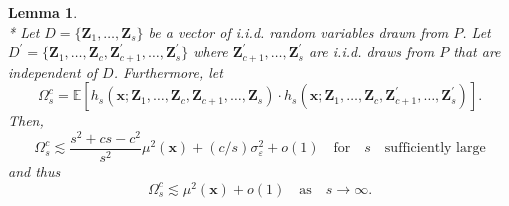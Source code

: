\documentclass[letterpaper,10pt]{article}
\numberwithin{equation}{section}
\numberwithin{thm}{section}
\newtheorem{lem}{Lemma}
\numberwithin{lem}{section}
\numberwithin{cor}{section}
\newcommand{\E}{\mathbb{E}}
\newcommand{\1}{\mathbbm{1}}
\begin{document}
\newpage
\begin{lem}\label{lem:omega_sc}\mbox{}\\*
	Let $D = \{\mathbf{Z}_1, \dotsc, \mathbf{Z}_{s}\}$ be a vector of i.i.d. random variables drawn from $P$.
	Let $D^{\prime} = \{\mathbf{Z}_1, \dotsc, \mathbf{Z}_{c}, \mathbf{Z}_{c+1}^{\prime}, \dotsc,  \mathbf{Z}_{s}^{\prime}\}$ where $\mathbf{Z}_{c+1}^{\prime}, \dotsc,  \mathbf{Z}_{s}^{\prime}$ are i.i.d. draws from $P$ that are independent of $D$.
	Furthermore, let
	\begin{equation}
		\Omega_{s}^{c}
		= \E\left[h_{s}\left(\mathbf{x}; \mathbf{Z}_1, \ldots, \mathbf{Z}_{c}, \mathbf{Z}_{c+1}, \ldots, \mathbf{Z}_{s}\right) \cdot
			h_{s}\left(\mathbf{x}; \mathbf{Z}_1, \ldots,\mathbf{Z}_{c}, \mathbf{Z}_{c+1}^{\prime}, \ldots, \mathbf{Z}_{s}^{\prime}\right)\right].
	\end{equation}
	Then,
	\begin{equation}
		\Omega_{s}^{c}
		\lesssim \frac{s^2 + cs  - c^2}{s^2} \mu^2(\mathbf{x}) + (c/s) \sigma_{\varepsilon}^2 + o(1)
		\quad \text{for} \quad s \quad \text{sufficiently large}
	\end{equation}
	and thus
	\begin{equation}
		\Omega_{s}^{c}
		\lesssim \mu^2(\mathbf{x}) + o(1)
		\quad \text{as} \quad s \rightarrow \infty.
	\end{equation}
\end{lem}
\end{document}
